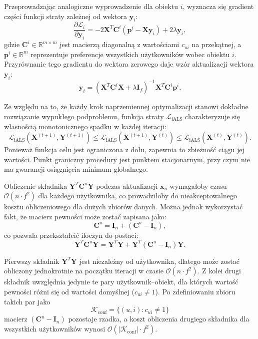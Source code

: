 Przeprowadzając analogiczne wyprowadzenie dla obiektu $i$, wyznacza się gradient części funkcji straty zależnej od wektora $\mathbf{y}_i$:
\begin{equation}
    \frac{\partial \mathcal{L}_i}{\partial \mathbf{y}_i} = -2 \mathbf{X}^T \mathbf{C}^i \left( \mathbf{p}^i - \mathbf{X} \mathbf{y}_i \right) + 2 \lambda \mathbf{y}_i,
\end{equation}
gdzie $\mathbf{C}^i \in \mathbb{R}^{m \times m}$ jest macierzą diagonalną z wartościami $c_{ui}$ na przekątnej, a $\mathbf{p}^i \in \mathbb{R}^m$ reprezentuje preferencje wszystkich użytkowników wobec obiektu $i$. Przyrównanie tego gradientu do wektora zerowego daje wzór aktualizacji wektora $\mathbf{y}_i$:
\begin{equation}
    \mathbf{y}_i = \left( \mathbf{X}^T \mathbf{C}^i \mathbf{X} + \lambda \mathbf{I}_f \right)^{-1} \mathbf{X}^T \mathbf{C}^i \mathbf{p}^i.
\end{equation}

Ze względu na to, że każdy krok naprzemiennej optymalizacji stanowi dokładne rozwiązanie wypukłego podproblemu, funkcja straty $\mathcal{L}_{\text{iALS}}$ charakteryzuje się własnością monotonicznego spadku w każdej iteracji:
\begin{equation}
    \mathcal{L}_{\text{iALS}}(\mathbf{X}^{(t+1)}, \mathbf{Y}^{(t+1)}) \le \mathcal{L}_{\text{iALS}}(\mathbf{X}^{(t+1)}, \mathbf{Y}^{(t)}) \le \mathcal{L}_{\text{iALS}}(\mathbf{X}^{(t)}, \mathbf{Y}^{(t)}).
\end{equation}
Ponieważ funkcja celu jest ograniczona z dołu, zapewnia to zbieżność ciągu jej wartości. Punkt graniczny procedury jest punktem stacjonarnym, przy czym nie ma gwarancji osiągnięcia minimum globalnego.

Obliczenie składnika $\mathbf{Y}^T \mathbf{C}^u \mathbf{Y}$ podczas aktualizacji $\mathbf{x}_u$ wymagałoby czasu $\mathcal{O}(n \cdot f^2)$ dla każdego użytkownika, co prowadziłoby do nieakceptowalnego kosztu obliczeniowego dla dużych zbiorów danych. Można jednak wykorzystać fakt, że macierz pewności może zostać zapisana jako:
\[
\mathbf{C}^u = \mathbf{I}_n + (\mathbf{C}^u-\mathbf{I}_n),
\]
co pozwala przekształcić iloczyn do postaci:
\begin{equation}
    \mathbf{Y}^T\mathbf{C}^u\mathbf{Y}
    =
    \mathbf{Y}^T\mathbf{Y}
    +
    \mathbf{Y}^T(\mathbf{C}^u-\mathbf{I}_n)\mathbf{Y}.
\end{equation}

Pierwszy składnik $\mathbf{Y}^T\mathbf{Y}$ jest niezależny od użytkownika, dlatego może zostać obliczony jednokrotnie na początku iteracji w czasie $\mathcal{O}(n\cdot f^2)$. Z kolei drugi składnik uwzględnia jedynie te pary użytkownik--obiekt, dla których wartość pewności różni się od wartości domyślnej ($c_{ui} \neq 1$). Po zdefiniowaniu zbioru takich par jako
\[
\mathcal{K}_{\text{conf}}=\{(u,i):c_{ui}\neq1\}
\]
macierz $(\mathbf{C}^u-\mathbf{I}_n)$ pozostaje rzadka, a koszt obliczenia drugiego składnika dla wszystkich użytkowników wynosi $\mathcal{O}(|\mathcal{K}_{\text{conf}}|\cdot f^2)$.

